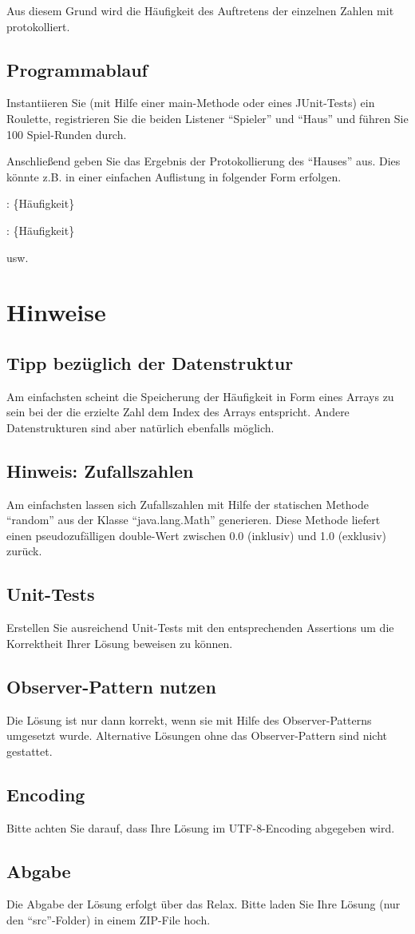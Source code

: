 \documentclass[oneside,a4paper]{scrartcl}
\begin{document}
Aus diesem Grund wird die Häufigkeit des Auftretens der einzelnen Zahlen mit protokolliert.

\subsection{Programmablauf}
Instantiieren Sie (mit Hilfe einer main-Methode oder eines JUnit-Tests) ein Roulette, registrieren
Sie die beiden Listener \enquote{Spieler} und \enquote{Haus} und führen Sie 100 Spiel-Runden durch.

Anschließend geben Sie das Ergebnis der Protokollierung des \enquote{Hauses} aus.
Dies könnte z.B. in einer einfachen Auflistung in folgender Form erfolgen.

: \{Häufigkeit\}

: \{Häufigkeit\}

\noindent
usw.


\section*{Hinweise}
\subsection*{Tipp bezüglich der Datenstruktur}
Am einfachsten scheint die Speicherung der Häufigkeit in Form eines Arrays zu sein bei
der die erzielte Zahl dem Index des Arrays entspricht.
Andere Datenstrukturen sind aber natürlich ebenfalls möglich.

\subsection*{Hinweis: Zufallszahlen}
Am einfachsten lassen sich Zufallszahlen mit Hilfe der statischen Methode \enquote{random} aus der
Klasse \enquote{java.lang.Math} generieren. Diese Methode liefert einen pseudozufälligen double-Wert zwischen 
0.0 (inklusiv) und 1.0 (exklusiv) zurück.

\subsection*{Unit-Tests}
Erstellen Sie ausreichend Unit-Tests mit den entsprechenden Assertions um die Korrektheit Ihrer Lösung
beweisen zu können.

\subsection*{Observer-Pattern nutzen}
Die Lösung ist nur dann korrekt, wenn sie mit Hilfe des Observer-Patterns umgesetzt wurde. Alternative Lösungen
ohne das Observer-Pattern sind nicht gestattet. 

\subsection*{Encoding}
Bitte achten Sie darauf, dass Ihre Lösung im UTF-8-Encoding abgegeben wird.

\subsection*{Abgabe}
Die Abgabe der Lösung erfolgt über das Relax. Bitte laden Sie Ihre Lösung (nur den \enquote{src}-Folder)
in einem ZIP-File hoch.
\end{document}
